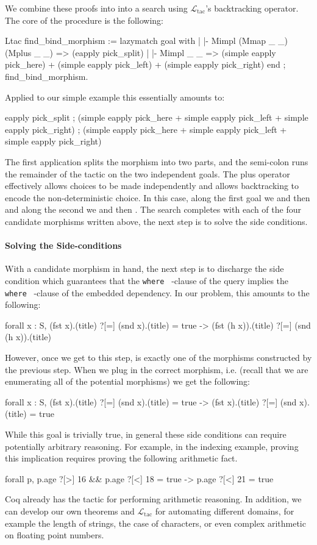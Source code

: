 \documentclass[preprint]{sigplanconf}
\newcommand{\WHERE}{{\tt where} \ }
\newcommand{\ltac}[0]{\ensuremath{\mathcal{L}_{\mathrm{tac}}}}
\begin{document}
We combine these proofs into into a search using \ltac's backtracking \coqe{+} operator.
The core of the procedure is the following:
\begin{coq}
Ltac find_bind_morphism :=
  lazymatch goal with
  | |- Mimpl (Mmap _ _) (Mplus _ _) =>
      (eapply pick_split)
  | |- Mimpl _ _  =>
      (simple eapply pick_here)
    + (simple eapply pick_left)
    + (simple eapply pick_right)
  end ; find_bind_morphism.
\end{coq}
Applied to our simple example this essentially amounts to:
\begin{coq}
eapply pick_split ;
  (simple eapply pick_here + simple eapply pick_left + simple eapply pick_right) ;
  (simple eapply pick_here + simple eapply pick_left + simple eapply pick_right)
\end{coq}
The first application splits the morphism into two parts, and the semi-colon runs the remainder of the tactic on the two independent goals.
The plus operator effectively allows choices to be made independently and allows backtracking to encode the non-deterministic choice.
In this case, along the first goal we  and then  and along the second we  and then .
The search completes with each of the four candidate morphisms written above, the next step is to solve the side conditions.

\paragraph{Solving the Side-conditions}
With a candidate morphism in hand, the next step is to discharge the side condition which guarantees that the \WHERE-clause of the query implies the \WHERE-clause of the embedded dependency.
In our problem, this amounts to the following:
\begin{coq}
forall x : S, (fst x).(title) ?[=] (snd x).(title) = true
     -> (fst (h x)).(title) ?[=] (snd (h x)).(title)
\end{coq}
However, once we get to this step,  is exactly one of the morphisms constructed by the previous step.
When we plug in the correct morphism, i.e.  (recall that we are enumerating all of the potential morphisms) we get the following:
\begin{coq}
forall x : S, (fst x).(title) ?[=] (snd x).(title) = true
     -> (fst x).(title) ?[=] (snd x).(title) = true
\end{coq}
While this goal is trivially true, in general these side conditions can require potentially arbitrary reasoning.
For example, in the indexing example, proving this implication requires proving the following arithmetic fact.
\begin{coq}
forall p, p.age ?[>] 16 && p.age ?[<] 18 = true ->
          p.age ?[<] 21 = true
\end{coq}
Coq already has the  tactic for performing arithmetic reasoning.
In addition, we can develop our own theorems and \ltac{} for automating different domains, for example the length of strings, the case of characters, or even complex arithmetic on floating point numbers.
\end{document}
